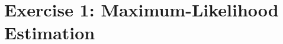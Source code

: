 \documentclass[
	pdftex,						%
	a4paper, 						%
	12pt, 							%
	headsepline						%
]{scrartcl}							%
\begin{document}


\newpage


\pagebreak
{}	%
\setcounter{page}{1}	%

\section{Exercise 1: Maximum-Likelihood Estimation}



\end{document}
